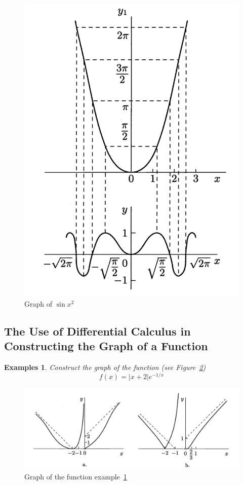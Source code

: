 \documentclass[a4paper,12pt]{article} %
\newtheorem{example}{Examples}
\begin{document}
\begin{figure}
\begin{minipage}[htbp]{0.4\textwidth}
        \includegraphics[width = \textwidth]{funplot2.png}
        \caption{Graph of $\sin x^2$}
    \end{minipage}
    \label{fig:fig4}
\end{figure}

\subsection{The Use of Differential Calculus in Constructing 
the Graph of a Function}
\begin{example}
    \normalfont
    Construct the graph of the function (see Figure~\ref{fig:fig5})
    \[
        f(x) = \vert x + 2 \vert e^{-1/x}
        \]
    \label{ex:ex3}
\end{example}
\begin{figure}[htbp]
    \centering
    \includegraphics[width = \textwidth]{funplot3.png}
    \caption{Graph of the function example~\ref{ex:ex3}}
    \label{fig:fig5}
\end{figure}
    
\end{document}
